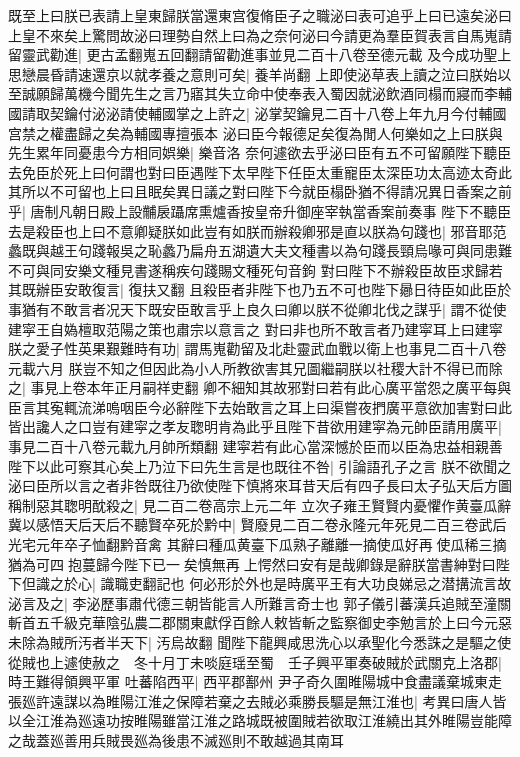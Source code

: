 既至上曰朕已表請上皇東歸朕當還東宫復脩臣子之職泌曰表可追乎上曰已遠矣泌曰上皇不來矣上驚問故泌曰理勢自然上曰為之奈何泌曰今請更為羣臣賀表言自馬嵬請留靈武勸進|{
	更古孟翻嵬五回翻請留勸進事並見二百十八卷至德元載}
及今成功聖上思戀晨昏請速還京以就孝養之意則可矣|{
	養羊尚翻}
上即使泌草表上讀之泣曰朕始以至誠願歸萬機今聞先生之言乃寤其失立命中使奉表入蜀因就泌飲酒同榻而寢而李輔國請取契鑰付泌泌請使輔國掌之上許之|{
	泌掌契鑰見二百十八卷上年九月今付輔國宫禁之權盡歸之矣為輔國專擅張本}
泌曰臣今報德足矣復為閒人何樂如之上曰朕與先生累年同憂患今方相同娯樂|{
	樂音洛}
奈何遽欲去乎泌曰臣有五不可留願陛下聽臣去免臣於死上曰何謂也對曰臣遇陛下太早陛下任臣太重寵臣太深臣功太高迹太奇此其所以不可留也上曰且眠矣異日議之對曰陛下今就臣榻卧猶不得請况異日香案之前乎|{
	唐制凡朝日殿上設黼扆躡席熏爐香按皇帝升御座宰執當香案前奏事}
陛下不聽臣去是殺臣也上曰不意卿疑朕如此豈有如朕而辦殺卿邪是直以朕為句踐也|{
	邪音耶范蠡既與越王句踐報吳之恥蠡乃扁舟五湖遺大夫文種書以為句踐長頸烏喙可與同患難不可與同安樂文種見書遂稱疾句踐賜文種死句音鉤}
對曰陛下不辦殺臣故臣求歸若其既辦臣安敢復言|{
	復扶又翻}
且殺臣者非陛下也乃五不可也陛下曏日待臣如此臣於事猶有不敢言者况天下既安臣敢言乎上良久曰卿以朕不從卿北伐之謀乎|{
	謂不從使建寜王自媯檀取范陽之策也肅宗以意言之}
對曰非也所不敢言者乃建寜耳上曰建寜朕之愛子性英果艱難時有功|{
	謂馬嵬勸留及北赴靈武血戰以衛上也事見二百十八卷元載六月}
朕豈不知之但因此為小人所教欲害其兄圖繼嗣朕以社稷大計不得已而除之|{
	事見上卷本年正月嗣祥吏翻}
卿不細知其故邪對曰若有此心廣平當怨之廣平每與臣言其寃輒流涕嗚咽臣今必辭陛下去始敢言之耳上曰渠嘗夜捫廣平意欲加害對曰此皆出讒人之口豈有建寜之孝友聦明肯為此乎且陛下昔欲用建寜為元帥臣請用廣平|{
	事見二百十八卷元載九月帥所類翻}
建寜若有此心當深憾於臣而以臣為忠益相親善陛下以此可察其心矣上乃泣下曰先生言是也既往不咎|{
	引論語孔子之言}
朕不欲聞之泌曰臣所以言之者非咎既往乃欲使陛下慎將來耳昔天后有四子長曰太子弘天后方圖稱制惡其聦明酖殺之|{
	見二百二卷高宗上元二年}
立次子雍王賢賢内憂懼作黄臺瓜辭冀以感悟天后天后不聽賢卒死於黔中|{
	賢廢見二百二卷永隆元年死見二百三卷武后光宅元年卒子恤翻黔音禽}
其辭曰種瓜黄臺下瓜熟子離離一摘使瓜好再使瓜稀三摘猶為可四抱蔓歸今陛下已一矣慎無再上愕然曰安有是哉卿錄是辭朕當書紳對曰陛下但識之於心|{
	識職吏翻記也}
何必形於外也是時廣平王有大功良娣忌之潜搆流言故泌言及之|{
	李泌歷事肅代德三朝皆能言人所難言奇士也}
郭子儀引蕃漢兵追賊至潼關斬首五千級克華陰弘農二郡關東獻俘百餘人敕皆斬之監察御史李勉言於上曰今元惡未除為賊所汚者半天下|{
	汚烏故翻}
聞陛下龍興咸思洗心以承聖化今悉誅之是驅之使從賊也上遽使赦之　冬十月丁未啖庭瑶至蜀　壬子興平軍奏破賊於武關克上洛郡|{
	時王難得領興平軍}
吐蕃陷西平|{
	西平郡鄯州}
尹子奇久圍睢陽城中食盡議棄城東走張廵許遠謀以為睢陽江淮之保障若棄之去賊必乘勝長驅是無江淮也|{
	考異曰唐人皆以全江淮為廵遠功按睢陽雖當江淮之路城既被圍賊若欲取江淮繞出其外睢陽豈能障之哉蓋廵善用兵賊畏廵為後患不滅廵則不敢越過其南耳}
